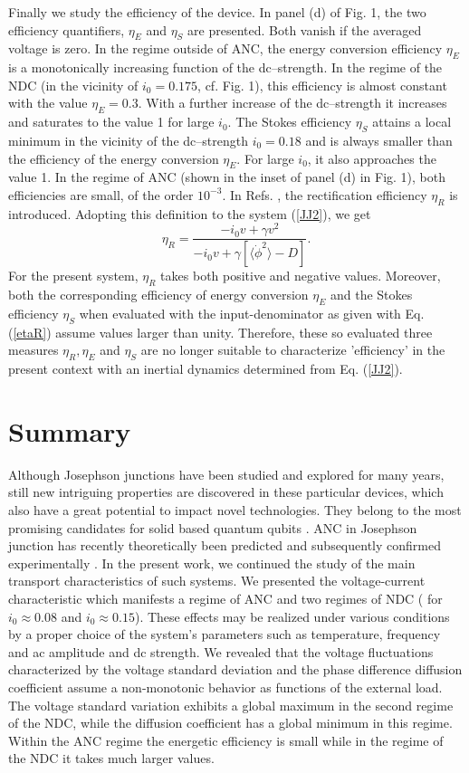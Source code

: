 \documentclass[a4,twocolumn,showpacs,showkeys]{revtex4}
\def\be{\begin{equation}}
\def\ee#1{\label{#1}\end{equation}}
\def\la{\langle}
\def\ra{\rangle}
\begin{document}
Finally we study the efficiency of the device. In panel (d) of
Fig. 1, the two efficiency quantifiers, $\eta_E$ and  $\eta_S$ are presented. 
Both vanish if the averaged voltage is zero. 
In the regime outside of ANC, the energy conversion  efficiency
$\eta_E$ is a monotonically increasing  function of the dc--strength.  
In the  regime of the  NDC (in the vicinity of  $i_0=0.175$,
cf. Fig. 1), this efficiency is almost constant with the value
$\eta_{E} = 0.3$.   With a further increase of the dc--strength it increases and saturates 
to the value 1 for large $i_0$.  The Stokes efficiency  $\eta_S$  attains a local minimum in the
vicinity of the dc--strength  $i_0=0.18$ and is 
 always  smaller  than the efficiency of the energy conversion $\eta_E$.  
For large $i_0$, it also approaches the value 1. 
In the regime of ANC (shown in the inset of panel (d) in Fig. 1),  both efficiencies  
are small, of the order $10^{-3}$.  In Refs.
\cite{Suzuki2003},  the rectification efficiency
$\eta_R$ is introduced. Adopting this definition to the system (\ref{JJ2}), we get 
\be
 \eta_R = \frac{-i_0 v + \gamma v^2}{-i_0 v +  \gamma [\la \dot\phi^2 \ra - D]}. 
\ee{etaR}
%
For the present system,   $\eta_R$  takes both positive and
 negative values. Moreover,   both the corresponding   efficiency of energy conversion $\eta_E$ and   
the Stokes efficiency  $\eta_S$  when evaluated with  the input-denominator as 
given with Eq.  (\ref{etaR}) assume  values larger than unity.  Therefore, these so evaluated three measures  $\eta_R, \eta_E$ and $\eta_S$  are no longer suitable to characterize 'efficiency' 
in the present context with an inertial dynamics determined  from  Eq. (\ref{JJ2}). 

\section{Summary}

Although Josephson junctions have been studied and explored for many
years, still  new   intriguing properties are discovered  in these particular
devices, which also 
have  a great potential to impact novel technologies. They
belong to the most promising candidates for    solid based quantum qubits \cite{qubits}.   
ANC in Josephson junction has recently theoretically been predicted
\cite{machuraPRL} and subsequently
confirmed experimentally \cite{raj}. 
In the present work, we continued the study of  the main
transport characteristics of such  systems. We presented the
voltage-current characteristic which manifests  a regime of ANC and 
two regimes of NDC ( for $i_0 \approx 0.08$ and $i_0 \approx  0.15$). 
These effects may be realized  under various conditions  by a proper 
choice of the system's parameters such as temperature, frequency and ac
amplitude and    dc strength. 
We revealed that the voltage fluctuations characterized by the voltage
standard deviation and the phase difference diffusion coefficient 
 assume a non-monotonic behavior as functions of the
external load. The voltage standard variation exhibits a global maximum in
the second regime of  the NDC, while the diffusion coefficient has a
global minimum in this regime.  Within the ANC regime the 
energetic efficiency is   small while in the regime of the NDC it
takes much larger values.   
\end{document}
